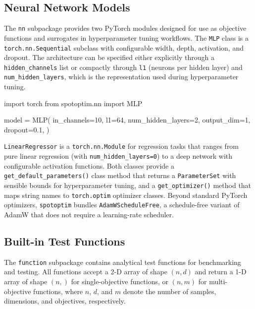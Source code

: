 \documentclass[
  twocolumn]{article}
\newenvironment{Shaded}{\begin{snugshade}}{\end{snugshade}}
\newcommand{\DecValTok}[1]{\textcolor[rgb]{0.68,0.00,0.00}{#1}}
\newcommand{\FloatTok}[1]{\textcolor[rgb]{0.68,0.00,0.00}{#1}}
\newcommand{\ImportTok}[1]{\textcolor[rgb]{0.00,0.46,0.62}{#1}}
\newcommand{\NormalTok}[1]{\textcolor[rgb]{0.00,0.23,0.31}{#1}}
\newcommand{\OperatorTok}[1]{\textcolor[rgb]{0.37,0.37,0.37}{#1}}
\begin{document}
\subsection{Neural Network Models}\label{sec-nn}

The \texttt{nn} subpackage provides two PyTorch modules designed for use
as objective functions and surrogates in hyperparameter tuning
workflows. The \texttt{MLP} class is a \texttt{torch.nn.Sequential}
subclass with configurable width, depth, activation, and dropout. The
architecture can be specified either explicitly through a
\texttt{hidden\_channels} list or compactly through \texttt{l1} (neurons
per hidden layer) and \texttt{num\_hidden\_layers}, which is the
representation used during hyperparameter tuning.

\begin{Shaded}
\begin{Highlighting}[]
\ImportTok{import}\NormalTok{ torch}
\ImportTok{from}\NormalTok{ spotoptim.nn }\ImportTok{import}\NormalTok{ MLP}

\NormalTok{model }\OperatorTok{=}\NormalTok{ MLP(}
\NormalTok{    in\_channels}\OperatorTok{=}\DecValTok{10}\NormalTok{,}
\NormalTok{    l1}\OperatorTok{=}\DecValTok{64}\NormalTok{,}
\NormalTok{    num\_hidden\_layers}\OperatorTok{=}\DecValTok{2}\NormalTok{,}
\NormalTok{    output\_dim}\OperatorTok{=}\DecValTok{1}\NormalTok{,}
\NormalTok{    dropout}\OperatorTok{=}\FloatTok{0.1}\NormalTok{,}
\NormalTok{)}
\end{Highlighting}
\end{Shaded}

\texttt{LinearRegressor} is a \texttt{torch.nn.Module} for regression
tasks that ranges from pure linear regression (with
\texttt{num\_hidden\_layers=0}) to a deep network with configurable
activation functions. Both classes provide a
\texttt{get\_default\_parameters()} class method that returns a
\texttt{ParameterSet} with sensible bounds for hyperparameter tuning,
and a \texttt{get\_optimizer()} method that maps string names to
\texttt{torch.optim} optimizer classes. Beyond standard PyTorch
optimizers, \texttt{spotoptim} bundles \texttt{AdamWScheduleFree}, a
schedule-free variant of AdamW that does not require a learning-rate
scheduler.

\subsection{Built-in Test Functions}\label{sec-functions}

The \texttt{function} subpackage contains analytical test functions for
benchmarking and testing. All functions accept a 2-D array of shape
\((n, d)\) and return a 1-D array of shape \((n,)\) for single-objective
functions, or \((n, m)\) for multi-objective functions, where \(n\),
\(d\), and \(m\) denote the number of samples, dimensions, and
objectives, respectively.
\end{document}
